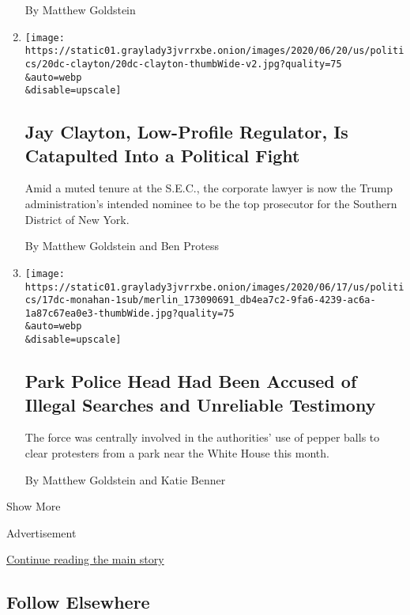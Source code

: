 \begin{enumerate}
  By Matthew Goldstein
\item
  \href{/2020/06/20/business/jay-clayton-sdny-sec.html}{}

  \texttt{[image: https://static01.graylady3jvrrxbe.onion/images/2020/06/20/us/politics/20dc-clayton/20dc-clayton-thumbWide-v2.jpg?quality=75\\\&auto=webp\\\&disable=upscale]}

  \hypertarget{jay-clayton-low-profile-regulator-is-catapulted-into-a-political-fight}{%
  \subsection{Jay Clayton, Low-Profile Regulator, Is Catapulted Into a
  Political
  Fight}\label{jay-clayton-low-profile-regulator-is-catapulted-into-a-political-fight}}

  Amid a muted tenure at the S.E.C., the corporate lawyer is now the
  Trump administration's intended nominee to be the top prosecutor for
  the Southern District of New York.

  By Matthew Goldstein and Ben Protess
\item
  \href{/2020/06/18/us/politics/park-police-gregory-monahan.html}{}

  \texttt{[image: https://static01.graylady3jvrrxbe.onion/images/2020/06/17/us/politics/17dc-monahan-1sub/merlin\_173090691\_db4ea7c2-9fa6-4239-ac6a-1a87c67ea0e3-thumbWide.jpg?quality=75\\\&auto=webp\\\&disable=upscale]}

  \hypertarget{park-police-head-had-been-accused-of-illegal-searches-and-unreliable-testimony}{%
  \subsection{Park Police Head Had Been Accused of Illegal Searches and
  Unreliable
  Testimony}\label{park-police-head-had-been-accused-of-illegal-searches-and-unreliable-testimony}}

  The force was centrally involved in the authorities' use of pepper
  balls to clear protesters from a park near the White House this month.

  By Matthew Goldstein and Katie Benner
\end{enumerate}

Show More

Advertisement

\protect\hyperlink{after-mid2}{Continue reading the main story}

\hypertarget{follow-elsewhere}{%
\subsection{Follow Elsewhere}\label{follow-elsewhere}}

